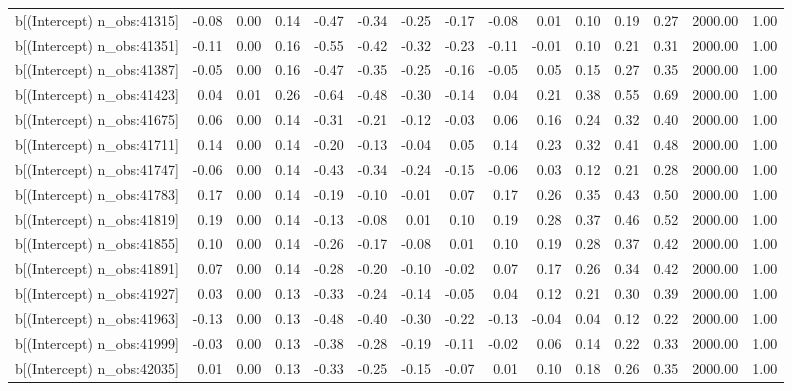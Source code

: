 \begin{table}[ht]
\begin{tabular}{rrrrrrrrrrrrrrr}
  b[(Intercept) n\_obs:41315] & -0.08 & 0.00 & 0.14 & -0.47 & -0.34 & -0.25 & -0.17 & -0.08 & 0.01 & 0.10 & 0.19 & 0.27 & 2000.00 & 1.00 \\ 
  b[(Intercept) n\_obs:41351] & -0.11 & 0.00 & 0.16 & -0.55 & -0.42 & -0.32 & -0.23 & -0.11 & -0.01 & 0.10 & 0.21 & 0.31 & 2000.00 & 1.00 \\ 
  b[(Intercept) n\_obs:41387] & -0.05 & 0.00 & 0.16 & -0.47 & -0.35 & -0.25 & -0.16 & -0.05 & 0.05 & 0.15 & 0.27 & 0.35 & 2000.00 & 1.00 \\ 
  b[(Intercept) n\_obs:41423] & 0.04 & 0.01 & 0.26 & -0.64 & -0.48 & -0.30 & -0.14 & 0.04 & 0.21 & 0.38 & 0.55 & 0.69 & 2000.00 & 1.00 \\ 
  b[(Intercept) n\_obs:41675] & 0.06 & 0.00 & 0.14 & -0.31 & -0.21 & -0.12 & -0.03 & 0.06 & 0.16 & 0.24 & 0.32 & 0.40 & 2000.00 & 1.00 \\ 
  b[(Intercept) n\_obs:41711] & 0.14 & 0.00 & 0.14 & -0.20 & -0.13 & -0.04 & 0.05 & 0.14 & 0.23 & 0.32 & 0.41 & 0.48 & 2000.00 & 1.00 \\ 
  b[(Intercept) n\_obs:41747] & -0.06 & 0.00 & 0.14 & -0.43 & -0.34 & -0.24 & -0.15 & -0.06 & 0.03 & 0.12 & 0.21 & 0.28 & 2000.00 & 1.00 \\ 
  b[(Intercept) n\_obs:41783] & 0.17 & 0.00 & 0.14 & -0.19 & -0.10 & -0.01 & 0.07 & 0.17 & 0.26 & 0.35 & 0.43 & 0.50 & 2000.00 & 1.00 \\ 
  b[(Intercept) n\_obs:41819] & 0.19 & 0.00 & 0.14 & -0.13 & -0.08 & 0.01 & 0.10 & 0.19 & 0.28 & 0.37 & 0.46 & 0.52 & 2000.00 & 1.00 \\ 
  b[(Intercept) n\_obs:41855] & 0.10 & 0.00 & 0.14 & -0.26 & -0.17 & -0.08 & 0.01 & 0.10 & 0.19 & 0.28 & 0.37 & 0.42 & 2000.00 & 1.00 \\ 
  b[(Intercept) n\_obs:41891] & 0.07 & 0.00 & 0.14 & -0.28 & -0.20 & -0.10 & -0.02 & 0.07 & 0.17 & 0.26 & 0.34 & 0.42 & 2000.00 & 1.00 \\ 
  b[(Intercept) n\_obs:41927] & 0.03 & 0.00 & 0.13 & -0.33 & -0.24 & -0.14 & -0.05 & 0.04 & 0.12 & 0.21 & 0.30 & 0.39 & 2000.00 & 1.00 \\ 
  b[(Intercept) n\_obs:41963] & -0.13 & 0.00 & 0.13 & -0.48 & -0.40 & -0.30 & -0.22 & -0.13 & -0.04 & 0.04 & 0.12 & 0.22 & 2000.00 & 1.00 \\ 
  b[(Intercept) n\_obs:41999] & -0.03 & 0.00 & 0.13 & -0.38 & -0.28 & -0.19 & -0.11 & -0.02 & 0.06 & 0.14 & 0.22 & 0.33 & 2000.00 & 1.00 \\ 
  b[(Intercept) n\_obs:42035] & 0.01 & 0.00 & 0.13 & -0.33 & -0.25 & -0.15 & -0.07 & 0.01 & 0.10 & 0.18 & 0.26 & 0.35 & 2000.00 & 1.00 \\ 

\end{tabular}
\end{table}
